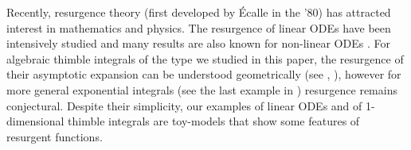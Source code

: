 \documentclass{article}
\theoremstyle{definition}
\theoremstyle{plain}
\begin{document}
Recently, resurgence theory (first developed by \'Ecalle in the '80) has attracted interest in mathematics and physics. The resurgence of linear ODEs have been intensively studied \cite{loday1994stokes,diverg-resurg--ii} and many results are also known for non-linear ODEs \cite{costin-PI,costin_kruskal,diverg-resurg-iii,schiappa-PI}. For algebraic thimble integrals of the type we studied in this paper, the resurgence of their asymptotic expansion can be understood geometrically (see \cite{Maxim_slide_ERC}, \cite[Section 6.2]{kontsevich2022analyticity}), however for more general exponential integrals (see the last example in \cite{Maxim_slide_ERC}) resurgence remains conjectural. Despite their simplicity, our examples of linear ODEs and of 1-dimensional thimble integrals are toy-models that show some features of resurgent functions. 
\end{document}
